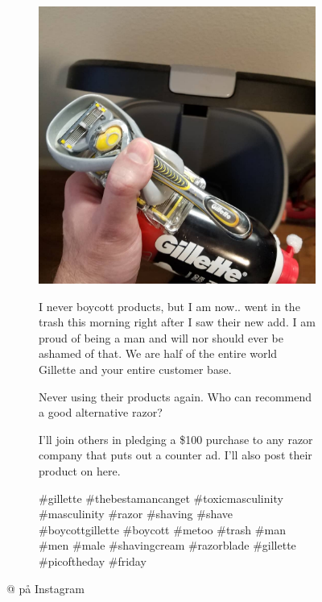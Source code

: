 \begin{figure}[H]
    \footnotesize
    \centering
    \begin{subfigure}[b]{0.48\linewidth}
        \includegraphics[width=\textwidth]{../data/cases/boycott/2019-01-18_18-43-33_UTC.jpg}
    \end{subfigure}
    \qquad
    \begin{subfigure}[b]{0.3\linewidth}

        I never boycott products, but I am now.. \@gillette went 
        in the trash this morning right after I saw their new add.  
        I am proud of being a man and will nor should ever be 
        ashamed of that.  We are half of the entire world Gillette 
        and your entire customer base.

        Never using their products again.  Who can recommend a 
        good alternative razor?

        I'll join others in pledging a \$100 purchase to any razor 
        company that puts out a counter ad.  I'll also post their 
        product on here.
        
        \#gillette \#thebestamancanget \#toxicmasculinity 
        \#masculinity \#razor \#shaving \#shave \#boycottgillette 
        \#boycott \#metoo \#trash \#man \#men \#male \#shavingcream 
        \#razorblade \#gillette \#picoftheday \#friday 
    \@dollarshaveclub \@harrys \@bevel \@theartofshaving    
\end{subfigure}
    \caption{@\citeauthor{david_s1000rr2019} på Instagram}
    \label{img:boycott}
\end{figure}

